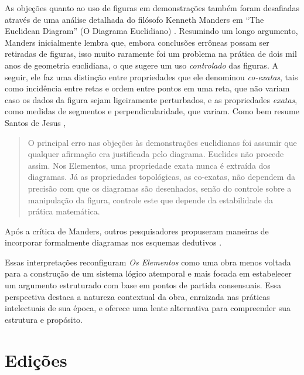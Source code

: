 \documentclass{hipatia}
\begin{document}
As objeções quanto ao uso de figuras em 
demonstrações também foram desafiadas através
de uma análise detalhada do filósofo 
Kenneth Manders em ``The Euclidean Diagram''
(O Diagrama Euclidiano) \cite{Manders95}. Resumindo um
longo argumento,
Manders inicialmente lembra que, embora 
conclusões errôneas possam ser retiradas
de figuras, isso muito raramente foi um problema
na prática de dois mil anos de
geometria euclidiana, o que sugere um 
uso \emph{controlado} das figuras. A seguir,
ele faz uma distinção entre propriedades
que ele denominou \emph{co-exatas}, 
tais como incidência entre retas e ordem entre
pontos em uma reta, que não variam caso 
os dados da figura sejam ligeiramente perturbados,
e as propriedades \emph{exatas}, como 
medidas de segmentos e perpendicularidade, que variam.  
Como bem resume Santos de Jesus \cite{deJesus2023},
\begin{quote}
O principal erro nas objeções às demonstrações
euclidianas foi assumir que
qualquer afirmação era justificada pelo diagrama.
Euclides não procede assim. Nos
Elementos, uma propriedade exata nunca é extraída
dos diagramas. Já as propriedades
topológicas, as co-exatas, não dependem da precisão
com que os diagramas são desenhados,
senão do controle sobre a manipulação da figura,
controle este que depende da estabilidade da
prática matemática.
\end{quote}
Após a crítica de Manders, outros pesquisadores
propuseram maneiras de incorporar formalmente
diagramas nos esquemas dedutivos \cite{mumma2006, avigad2009}. 

Essas interpretações reconfiguram
 \emph{Os Elementos} como
uma obra menos voltada para a construção de um sistema
lógico atemporal e mais focada em estabelecer um argumento
estruturado com base em pontos de partida consensuais. Essa
perspectiva destaca a natureza contextual da obra, enraizada
nas práticas intelectuais de sua época, e oferece uma lente
alternativa para compreender sua estrutura e propósito.

\section{Edições}

\end{document}
